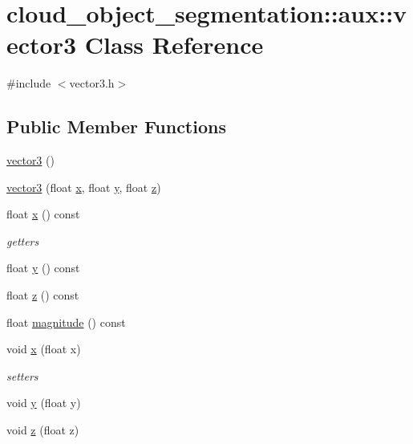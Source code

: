\hypertarget{classcloud__object__segmentation_1_1aux_1_1vector3}{}\section{cloud\+\_\+object\+\_\+segmentation\+:\+:aux\+:\+:vector3 Class Reference}
\label{classcloud__object__segmentation_1_1aux_1_1vector3}


{\ttfamily \#include $<$vector3.\+h$>$}

\subsection*{Public Member Functions}
\begin{DoxyCompactItemize}
\item 
\hyperlink{classcloud__object__segmentation_1_1aux_1_1vector3_a8e47e5a22d02601de1bab23e4982f97d}{vector3} ()
\item 
\hyperlink{classcloud__object__segmentation_1_1aux_1_1vector3_a365ad471fda29141360caeb99c30a841}{vector3} (float \hyperlink{classcloud__object__segmentation_1_1aux_1_1vector3_ad55f623f503599c81bb8ac9d11930082}{x}, float \hyperlink{classcloud__object__segmentation_1_1aux_1_1vector3_a1216cd704515e5daa31491f032c018b7}{y}, float \hyperlink{classcloud__object__segmentation_1_1aux_1_1vector3_a7b65d519bacff492f6632d7c8073bced}{z})
\item 
float \hyperlink{classcloud__object__segmentation_1_1aux_1_1vector3_ad55f623f503599c81bb8ac9d11930082}{x} () const 
\begin{DoxyCompactList}\small\item\em getters \end{DoxyCompactList}\item 
float \hyperlink{classcloud__object__segmentation_1_1aux_1_1vector3_a1216cd704515e5daa31491f032c018b7}{y} () const 
\item 
float \hyperlink{classcloud__object__segmentation_1_1aux_1_1vector3_a7b65d519bacff492f6632d7c8073bced}{z} () const 
\item 
float \hyperlink{classcloud__object__segmentation_1_1aux_1_1vector3_ac6347d623b96c4a4f1386eac534986f5}{magnitude} () const 
\item 
void \hyperlink{classcloud__object__segmentation_1_1aux_1_1vector3_a832021a35549838d667903896f7a5ba3}{x} (float x)
\begin{DoxyCompactList}\small\item\em setters \end{DoxyCompactList}\item 
void \hyperlink{classcloud__object__segmentation_1_1aux_1_1vector3_a752781944fedb1ebd4ab0df8521d457a}{y} (float y)
\item 
void \hyperlink{classcloud__object__segmentation_1_1aux_1_1vector3_a5bb790cfd19e5be26f97deca3e93dff9}{z} (float z)
\end{DoxyCompactItemize}


